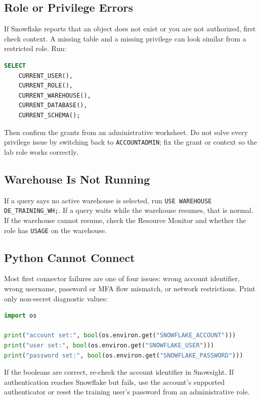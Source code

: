 \subsection{Role or Privilege Errors}
If Snowflake reports that an object does not exist or you are not authorized, first check context. A missing table and a missing privilege can look similar from a restricted role. Run:
\begin{lstlisting}[language=SQL,caption={Inspecting current execution context.},label={lst:chapter0-troubleshooting-context}]
SELECT
    CURRENT_USER(),
    CURRENT_ROLE(),
    CURRENT_WAREHOUSE(),
    CURRENT_DATABASE(),
    CURRENT_SCHEMA();
\end{lstlisting}
Then confirm the grants from an administrative worksheet. Do not solve every privilege issue by switching back to \texttt{ACCOUNTADMIN}; fix the grant or context so the lab role works correctly.

\subsection{Warehouse Is Not Running}
If a query says no active warehouse is selected, run \texttt{USE WAREHOUSE DE\_TRAINING\_WH;}. If a query waits while the warehouse resumes, that is normal. If the warehouse cannot resume, check the Resource Monitor and whether the role has \texttt{USAGE} on the warehouse.

\subsection{Python Cannot Connect}
Most first connector failures are one of four issues: wrong account identifier, wrong username, password or MFA flow mismatch, or network restrictions. Print only non-secret diagnostic values:
\begin{lstlisting}[language=Python,caption={Safe connector diagnostics that avoid printing secrets.},label={lst:chapter0-python-diagnostics}]
import os

print("account set:", bool(os.environ.get("SNOWFLAKE_ACCOUNT")))
print("user set:", bool(os.environ.get("SNOWFLAKE_USER")))
print("password set:", bool(os.environ.get("SNOWFLAKE_PASSWORD")))
\end{lstlisting}
If the booleans are correct, re-check the account identifier in Snowsight. If authentication reaches Snowflake but fails, use the account's supported authenticator or reset the training user's password from an administrative role.

